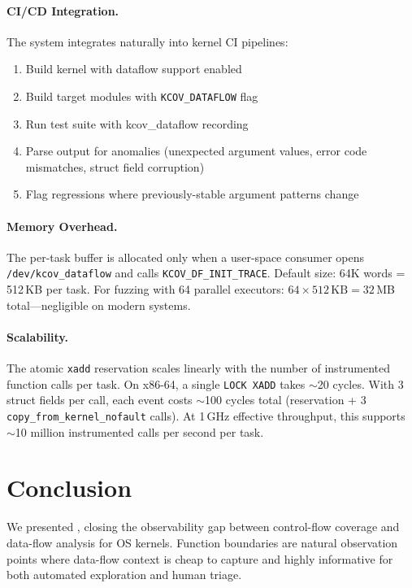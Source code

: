 \documentclass{ndss}
\begin{document}
\paragraph{CI/CD Integration.} The system integrates naturally into kernel CI
pipelines:
\begin{enumerate}[nosep]
  \item Build kernel with dataflow support enabled
  \item Build target modules with \texttt{KCOV\_DATAFLOW} flag
  \item Run test suite with kcov\_dataflow recording
  \item Parse output for anomalies (unexpected argument values, error code
        mismatches, struct field corruption)
  \item Flag regressions where previously-stable argument patterns change
\end{enumerate}

\paragraph{Memory Overhead.} The per-task buffer is allocated only when a
user-space consumer opens \texttt{/dev/kcov\_dataflow} and calls
\texttt{KCOV\_DF\_INIT\_TRACE}. Default size: 64K words = 512\,KB per task.
For fuzzing with 64 parallel executors: $64 \times 512\,\text{KB} = 32\,$MB
total---negligible on modern systems.

\paragraph{Scalability.} The atomic \texttt{xadd} reservation scales linearly
with the number of instrumented function calls per task. On x86-64, a single
\texttt{LOCK XADD} takes $\sim$20 cycles. With 3 struct fields per call, each
event costs $\sim$100 cycles total (reservation + 3 \texttt{copy\_from\_kernel\_nofault} calls). At 1\,GHz effective throughput, this supports
$\sim$10 million instrumented calls per second per task.

\section{Conclusion}\label{sec:conclusion}

We presented \toolname{}, closing the observability gap between control-flow
coverage and data-flow analysis for OS kernels. Function boundaries are natural
observation points where data-flow context is cheap to capture and highly
informative for both automated exploration and human triage.
\end{document}
